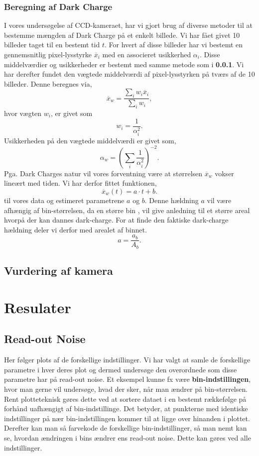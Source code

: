 \documentclass[working]{tuftebook}
\begin{document}
\subsection{Beregning af Dark Charge}
I vores undersøgelse af CCD-kameraet, har vi gjort brug af diverse metoder til at bestemme mængden af Dark Charge på et enkelt billede. Vi har fået givet 10 billeder taget til en bestemt tid $t$. For hvert af disse billeder har vi bestemt en gennemsnitlig pixel-lysstyrke $\overline{x}_i$ med en associeret usikkerhed $\alpha_i $. Disse middelværdier og usikkerheder er bestemt med samme metode som i \textbf{0.0.1}. Vi har derefter fundet den vægtede middelværdi af pixel-lysstyrken på tværs af de 10 billeder. Denne beregnes via,
\[
	\overline{x}_w = \frac{\sum_i w_i\overline{x}_i}{\sum_i w_i} 
,\]
hvor vægten $w_i$, er givet som
 \[
w_i = \frac{1}{\alpha _i^2}
.\]
Usikkerheden på den vægtede middelværdi er givet som,
\[
\alpha_w =\left( \sum_{i} \frac{1}{\alpha _i^2}   \right)^{-2}
.\]
Pga. Dark Charges natur vil vores forventning være at størrelsen $\overline{x}_w$ vokser lineært med tiden. Vi har derfor fittet funktionen,
\[
\overline{x}_w\left( t \right)  = a\cdot t + b
.\]
til vores data og estimeret parametrene $a$ og $b$. Denne hældning $a$ vil være afhængig af bin-størrelsen, da en større bin , vil give anledning til et større areal hvorpå der kan dannes dark-charge. For at finde den faktiske dark-charge hældning deler vi derfor med arealet af binnet.
\[
a = \frac{a_b}{A_b}
.\] 
\section{Vurdering af kamera}
\chapter{Resulater}
\section{Read-out Noise}
Her følger plots af de forskellige indstillinger. Vi har valgt at samle de forskellige parametre i hver deres plot og dermed undersøge den overordnede som disse parametre har på read-out noise.
Et eksempel kunne fx være \textbf{bin-indstillingen}, hvor man gerne vil undersøge, hvad der sker, når man ændrer på bin-størrelsen. Rent plotteteknisk gøres dette ved at sortere dataet i en bestemt rækkefølge på forhånd uafhængigt af bin-indstillinge. Det betyder, at punkterne med identiske indstillinger på nær bin-indstillingen kommer til at ligge over hinanden i plottet. Derefter kan man så farvekode de forskellige bin-indstillinger, så man nemt kan se, hvordan ændringen i bins ændrer ens read-out noise. Dette kan gøres ved alle indstillinger.
\end{document}
